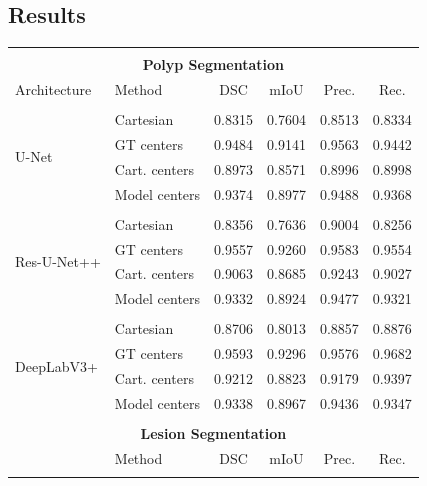   \subsection{Results}


\begin{table}
\centering
\def\arraystretch{1.25}
\begin{tabular}{l l c c c c} 
 \hline \\ [-2ex]

 \multicolumn{6}{c}{\textbf{Polyp Segmentation}}\\[1ex]
 \hline
 Architecture & Method & DSC & mIoU & Prec. & Rec. \\ 
 \hline \\ [-1.5ex]
 
 \multirow{4}{7em}{{U-Net}}
& Cartesian & 0.8315 & 0.7604 & 0.8513 & 0.8334 \\
& GT centers & 0.9484 & 0.9141 & 0.9563 & 0.9442 \\
& Cart. centers & 0.8973 & 0.8571 & 0.8996 & 0.8998 \\
& Model centers & 0.9374 & 0.8977 & 0.9488 & 0.9368 \\ [1ex]
\hline \\ [-1.5ex]

 \multirow{4}{7em}{{Res-U-Net++}}
& Cartesian & 0.8356 & 0.7636 & 0.9004 & 0.8256 \\
& GT centers & 0.9557 & 0.9260 & 0.9583 & 0.9554 \\
& Cart. centers & 0.9063 & 0.8685 & 0.9243 & 0.9027 \\
& Model centers & 0.9332 & 0.8924 & 0.9477 & 0.9321 \\ [1ex]
\hline \\ [-1.5ex]

 \multirow{4}{7em}{{DeepLabV3+}}
& Cartesian & 0.8706 & 0.8013 & 0.8857 & 0.8876 \\
& GT centers & 0.9593 & 0.9296 & 0.9576 & 0.9682 \\
& Cart. centers & 0.9212 & 0.8823 & 0.9179 & 0.9397 \\
& Model centers & 0.9338 & 0.8967 & 0.9436 & 0.9347 \\ [1ex]
\hline \\ [-1.5ex]

\multicolumn{6}{c}{\textbf{Lesion Segmentation}}\\[1ex]
 \hline
  & Method & DSC & mIoU & Prec. & Rec. \\ 
 \hline \\ [-1.5ex]
 

\end{tabular}
\end{table}
